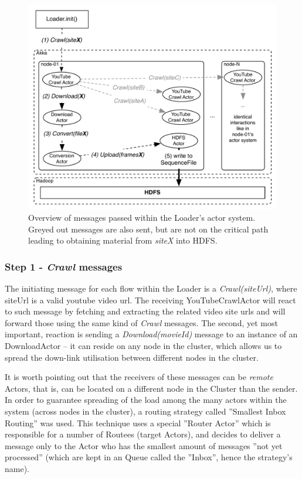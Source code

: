 \begin{figure}[ch!]
  \centering
  \includegraphics[scale=0.9]{./diagrams/loader-high-level.pdf}
  \caption{Overview of messages passed within the Loader's actor system. Greyed out messages are also sent, but are not on the critical path leading to obtaining material from \textit{siteX} into HDFS.}
  \label{fig:high-level-loader}
\end{figure}

\subsubsection{Step 1 - \textit{Crawl} messages}
The initiating message for each flow within the Loader is a \textit{Crawl(siteUrl)}, where siteUrl is a valid youtube video url.
The receiving YouTubeCrawlActor will react to such message by fetching and extracting the related video site urls and will forward those using the same kind of \textit{Crawl} messages. The second, yet most important, reaction is sending a \textit{Download(movieId)} message to an instance of an DownloadActor -- it  can reside on any node in the cluster, which allows us to spread the down-link utilisation between different nodes in the cluster.

It is worth pointing out that the receivers of these messages can be \textit{remote} Actors, that is, can be located on a different node in the Cluster than the sender. In order to guarantee spreading of the load among the many actors within the system (across nodes in the cluster), a routing strategy called ''Smallest Inbox Routing'' was used. This technique uses a special ''Router Actor'' which is responsible for a number of Routees (target Actors), and decides to deliver a message only to the Actor who has the smallest amount of messages ''not yet processed'' (which are kept in an Queue called the ''Inbox'', hence the strategy's name).

